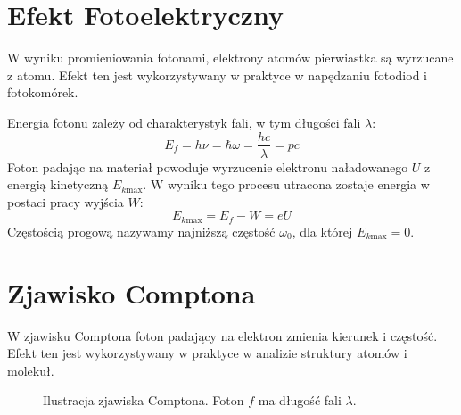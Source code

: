 \documentclass{../notatki}
\begin{document}
\section{Efekt Fotoelektryczny}

W wyniku promieniowania fotonami, elektrony atomów pierwiastka są
wyrzucane z atomu. Efekt ten jest wykorzystywany w praktyce w
napędzaniu fotodiod i fotokomórek.

Energia fotonu zależy od charakterystyk fali, w tym długości fali $\lambda$:
$$
E_f = h\nu = \hbar \omega = \frac{hc}{\lambda} = pc
$$
Foton padając na materiał powoduje wyrzucenie elektronu naładowanego
$U$ z energią kinetyczną $E_{k \text{max}}$. W wyniku tego procesu
utracona zostaje energia w postaci pracy wyjścia $W$:
$$
E_{k \text{max}} = E_f - W = eU
$$
Częstością progową nazywamy najniższą częstość $\omega_0$, dla której
$E_{k \text{max}} = 0$.

\section{Zjawisko Comptona}

W zjawisku Comptona foton padający na elektron zmienia kierunek i
częstość. Efekt ten jest wykorzystywany w praktyce w analizie struktury
atomów i molekuł.

\begin{figure}[h]
  \centering
  \caption{Ilustracja zjawiska Comptona. Foton $f$ ma długość fali $\lambda$.}
\end{figure}
\end{document}
